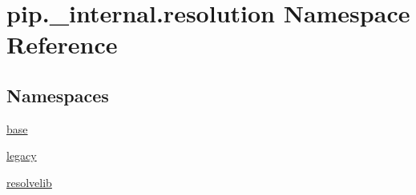\hypertarget{namespacepip_1_1__internal_1_1resolution}{}\section{pip.\+\_\+internal.\+resolution Namespace Reference}
\label{namespacepip_1_1__internal_1_1resolution}
\subsection*{Namespaces}
\begin{DoxyCompactItemize}
\item 
 \hyperlink{namespacepip_1_1__internal_1_1resolution_1_1base}{base}
\item 
 \hyperlink{namespacepip_1_1__internal_1_1resolution_1_1legacy}{legacy}
\item 
 \hyperlink{namespacepip_1_1__internal_1_1resolution_1_1resolvelib}{resolvelib}
\end{DoxyCompactItemize}
